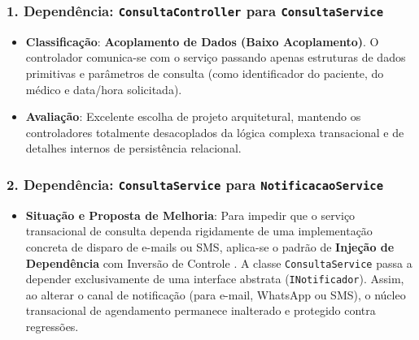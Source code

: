 \subsubsection{1. Dependência: \texttt{ConsultaController} para \texttt{ConsultaService}}
\begin{itemize}
    \item \textbf{Classificação}: \textbf{Acoplamento de Dados (Baixo Acoplamento)}. O controlador comunica-se com o serviço passando apenas estruturas de dados primitivas e parâmetros de consulta (como identificador do paciente, do médico e data/hora solicitada).
    \item \textbf{Avaliação}: Excelente escolha de projeto arquitetural, mantendo os controladores totalmente desacoplados da lógica complexa transacional e de detalhes internos de persistência relacional.
\end{itemize}

\subsubsection{2. Dependência: \texttt{ConsultaService} para \texttt{NotificacaoService}}
\begin{itemize}
    \item \textbf{Situação e Proposta de Melhoria}: Para impedir que o serviço transacional de consulta dependa rigidamente de uma implementação concreta de disparo de e-mails ou SMS, aplica-se o padrão de \textbf{Injeção de Dependência} com Inversão de Controle \cite{gamma1995, martin2019}. A classe \texttt{ConsultaService} passa a depender exclusivamente de uma interface abstrata (\texttt{INotificador}). Assim, ao alterar o canal de notificação (para e-mail, WhatsApp ou SMS), o núcleo transacional de agendamento permanece inalterado e protegido contra regressões.
\end{itemize}
